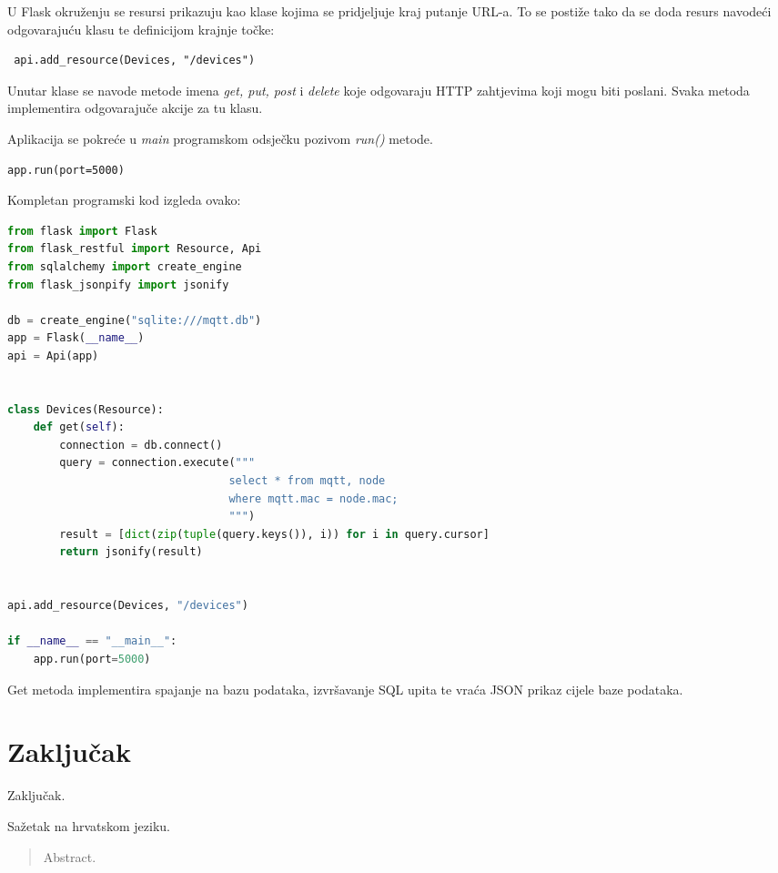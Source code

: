 \documentclass[times, utf8, zavrsni]{fer}
\begin{document}
U Flask okruženju se resursi prikazuju kao klase kojima se pridjeljuje kraj putanje URL-a. 
To se postiže tako da se doda resurs navodeći odgovarajuću klasu te definicijom krajnje točke:
\begin{lstlisting}
 api.add_resource(Devices, "/devices")
\end{lstlisting}

Unutar klase se navode metode imena \textit{get, put, post} i \textit{delete} koje odgovaraju HTTP zahtjevima koji mogu biti poslani.
Svaka metoda implementira odgovarajuče akcije za tu klasu.

Aplikacija se pokreće u \textit{main} programskom odsječku pozivom \textit{run()} metode.
\begin{lstlisting}
app.run(port=5000)
\end{lstlisting}


Kompletan programski kod izgleda ovako:
\begin{lstlisting}[language=Python, caption=REST API programski kod]
from flask import Flask
from flask_restful import Resource, Api
from sqlalchemy import create_engine
from flask_jsonpify import jsonify

db = create_engine("sqlite:///mqtt.db")
app = Flask(__name__)
api = Api(app)


class Devices(Resource):
    def get(self):
        connection = db.connect()
        query = connection.execute("""
                                  select * from mqtt, node
                                  where mqtt.mac = node.mac;
                                  """)
        result = [dict(zip(tuple(query.keys()), i)) for i in query.cursor]
        return jsonify(result)


api.add_resource(Devices, "/devices")

if __name__ == "__main__":
    app.run(port=5000)
\end{lstlisting}

Get metoda implementira spajanje na bazu podataka, izvršavanje SQL upita te vraća JSON prikaz cijele baze podataka.

\chapter{Zaključak}
Zaključak.




\begin{sazetak}
Sažetak na hrvatskom jeziku.

\end{sazetak}

\begin{abstract}
Abstract.

\end{abstract}
\end{document}
